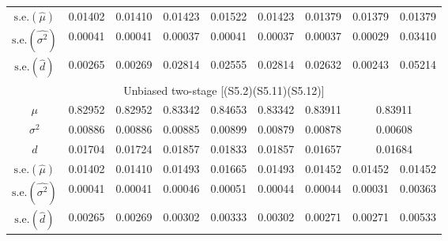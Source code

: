 \documentclass[11pt,a5paper,twoside]{book}
\begin{document}
\begin{table}[!t]
\begin{center}
\begin{tabular}{ccccccccc}
\hline
$\mbox{s.e.}(\widehat{\mu})$ & 0.01402 & 0.01410 & 0.01423 & 0.01522 & 0.01423 & 0.01379 & 0.01379 & 0.01379 \\
$\mbox{s.e.}(\widehat{\sigma^2})$ & 0.00041 & 0.00041 & 0.00037 & 0.00041 & 0.00037 & 0.00037 & 0.00029 & 0.03410 \\
  $\mbox{s.e.}(\widehat{d})$ & 0.00265 & 0.00269 & 0.02814 & 0.02555 & 0.02814 & 0.02632 & 0.00243 & 0.05214 \\


\hline\hline
\multicolumn{9}{c}{{Unbiased two-stage [(S5.2)(S5.11)(S5.12)]}}\\
\hline
$\mu$  & 0.82952 & 0.82952 & 0.83342 & 0.84653 & 0.83342 & 0.83911 & \multicolumn{2}{c}{0.83911}  \\
$\sigma^2$ & 0.00886 & 0.00886 & 0.00885 & 0.00899 & 0.00879 & 0.00878 & \multicolumn{2}{c}{0.00608}  \\
$d$ & 0.01704 & 0.01724 & 0.01857 & 0.01833 & 0.01857 & 0.01657 & \multicolumn{2}{c}{0.01684}  \\

\hline
$\mbox{s.e.}(\widehat{\mu})$ & 0.01402 & 0.01410 & 0.01493 & 0.01665 & 0.01493 & 0.01452 & 0.01452 & 0.01452 \\
$\mbox{s.e.}(\widehat{\sigma^2})$ & 0.00041 & 0.00041 & 0.00046 & 0.00051 & 0.00044 & 0.00044 & 0.00031 & 0.00363 \\
  $\mbox{s.e.}(\widehat{d})$ & 0.00265 & 0.00269 & 0.00302 & 0.00333 & 0.00302 & 0.00271 & 0.00271 & 0.00533 \\


\hline\hline
\end{tabular}
\end{center}
\end{table}



\end{document}
